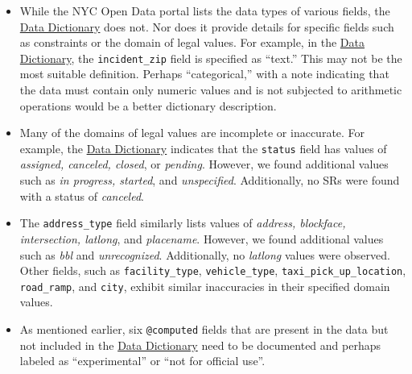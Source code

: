 \documentclass[linenumber]{jdsart}
\begin{document}
\begin{itemize}
    \item While the NYC Open Data portal lists the data types of various 
    fields, the \href{https://data.cityofnewyork.us/api/views/erm2-nwe9/files/b372b884-f86a-453b-ba16-1fe06ce9d212?download=true&filename=311_ServiceRequest_2010-Present_DataDictionary_Updated_2023.xlsx}{Data Dictionary} does not. Nor does it provide details for specific fields such as constraints or the domain of legal 
    values. For example, in the \href{https://data.cityofnewyork.us/api/views/erm2-nwe9/files/b372b884-f86a-453b-ba16-1fe06ce9d212?download=true&filename=311_ServiceRequest_2010-Present_DataDictionary_Updated_2023.xlsx}{Data Dictionary}, the \texttt{incident\_zip} 
    field is specified as ``text.'' This may not be the most suitable 
    definition. Perhaps ``categorical,'' with a note indicating that 
    the data must contain only numeric values and is not subjected to 
    arithmetic operations would be a better dictionary description.
    
    \item Many of the domains of legal values are incomplete or 
    inaccurate. For example, the \href{https://data.cityofnewyork.us/api/views/erm2-nwe9/files/b372b884-f86a-453b-ba16-1fe06ce9d212?download=true&filename=311_ServiceRequest_2010-Present_DataDictionary_Updated_2023.xlsx}{Data Dictionary} indicates that the 
    \texttt{status} field has values of \textit{assigned, canceled, 
    closed}, or \textit{pending}. However, we found additional
    values such as \textit{in progress, started}, and \textit{unspecified}. 
    Additionally, no SRs were found with a status of \textit{canceled}. 
    
    \item The \texttt{address\_type} field similarly 
    lists values of \textit{address, blockface, intersection, latlong}, 
    and \textit{placename}. However, we found additional values such as 
    \textit{bbl} and \textit{unrecognized}. Additionally, no \textit{latlong} 
    values were observed. Other fields, such as \texttt{facility\_type}, 
    \texttt{vehicle\_type}, \texttt{taxi\_pick\_up\_location}, 
    \texttt{road\_ramp}, and \texttt{city}, exhibit similar inaccuracies 
    in their specified domain values.
    
	\item As mentioned earlier, six \texttt{@computed} fields that are
    present in the data but not included in the \href{https://data.cityofnewyork.us/api/views/erm2-nwe9/files/b372b884-f86a-453b-ba16-1fe06ce9d212?download=true&filename=311_ServiceRequest_2010-Present_DataDictionary_Updated_2023.xlsx}{Data Dictionary} need
    to be documented and perhaps labeled as ``experimental'' or
    ``not for official use''.
\end{itemize}
\end{document}
